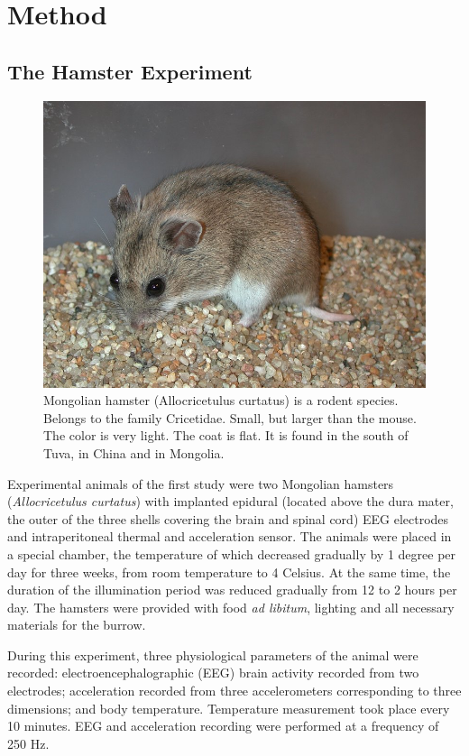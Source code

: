 \documentclass[14pt,a4paper]{scrartcl}
\begin{document}
\newpage

\section{Method}
\label{sec:Method}  

\subsection{The Hamster Experiment}
\label{sec:Methods:The Hamster Experiment}

\begin{figure}[H]
\centering
\includegraphics[width=0.7\linewidth]{curtatus.jpg}
\caption{Mongolian hamster (Allocricetulus curtatus) is a rodent species. Belongs to the family Cricetidae. Small, but larger than the mouse. The color is very light. The coat is flat. It is found in the south of Tuva, in China and in Mongolia.}\label{fig:curtatus}
\end{figure}

Experimental animals of the first study were two Mongolian hamsters (\textit{Allocricetulus curtatus}) with implanted epidural (located above the dura mater, the outer of the three shells covering the brain and spinal cord) EEG electrodes and intraperitoneal thermal and acceleration sensor. The animals were placed in a special chamber, the temperature of which decreased gradually by 1 degree per day for three weeks, from room temperature to 4 Celsius. At the same time, the duration of the illumination period was reduced gradually from 12 to 2 hours per day. The hamsters were provided with food \textit{ad libitum}, lighting and all necessary materials for the burrow. 

During this experiment, three physiological parameters of the animal were recorded: electroencephalographic (EEG) brain activity recorded from two electrodes; acceleration recorded from three accelerometers corresponding to three dimensions; and body temperature. Temperature measurement took place every 10 minutes. EEG and acceleration recording were performed at a frequency of 250 Hz. 
\end{document}
